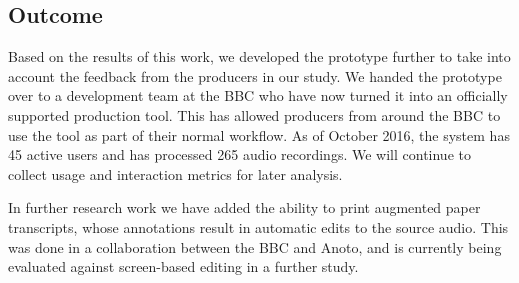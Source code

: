 




\subsection{Outcome}
Based on the results of this work, we developed the prototype further to take into account the feedback from the
producers in our study.  We handed the prototype over to a development team at the BBC who have now turned it into an
officially supported production tool.  This has allowed producers from around the BBC to use the tool as part of their
normal workflow.
As of October 2016, the system has 45 active users and has processed 265 audio recordings. We will
continue to collect usage and interaction metrics for later analysis.

In further research work we have added the ability to print augmented paper transcripts, whose annotations result in
automatic edits to the source audio. This was done in a collaboration between the BBC and Anoto, and is currently being
evaluated against screen-based editing in a further study.


